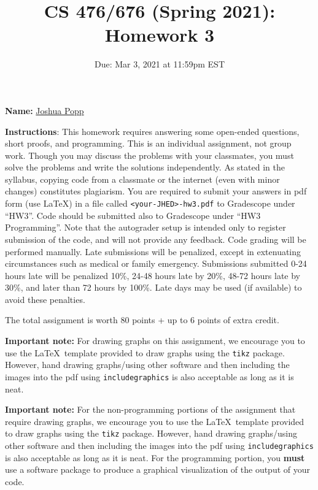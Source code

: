 \documentclass[letterpaper, 11pt]{article}
\title{CS 476/676 (Spring 2021): Homework 3}
\author{}
\date{Due: Mar 3, 2021 at 11:59pm EST}
\begin{document}
\maketitle

\setlength{\parindent}{0em}
\setlength{\parskip}{0.8em}

\large\textbf{Name:} \underline{\hspace{30pt} \color{blue} Joshua Popp \hspace{30pt}}
\vspace{1em}

	\textbf{Instructions}: This homework requires answering some open-ended questions, short proofs, and
	programming. This is an individual assignment, not group work. Though you may
	discuss the problems with your classmates, you must solve the problems and
	write the solutions independently. As stated in the syllabus, copying code
	from a classmate or the internet (even with minor changes) constitutes
	plagiarism. You are required to submit your answers in pdf form (use \LaTeX)
	in a file called \texttt{<your-JHED>-hw3.pdf} to Gradescope under ``HW3''. Code should be submitted also to Gradescope under ``HW3 Programming''. Note that the autograder setup is intended only to register submission of the code, and will not provide any feedback. Code grading will be performed manually.
	Late submissions will be penalized, except in extenuating circumstances such
	as medical or family emergency. Submissions submitted 0-24 hours late will be
	penalized 10\%, 24-48 hours late by 20\%, 48-72 hours late by 30\%, and later
    than 72 hours by 100\%. Late days may be used (if available) to avoid these penalties.

    The total assignment is worth 80 points + up to 6 points of extra credit.

    \textbf{Important note:} For drawing graphs on this assignment, we  encourage you to use the \LaTeX\  template provided to draw graphs using the \texttt{tikz} package. However, hand drawing graphs/using other software and then including the images into the pdf using \texttt{includegraphics} is also acceptable as long as it is neat.

    \textbf{Important note:} For the non-programming portions of the assignment that require drawing graphs, we  encourage you to use the \LaTeX\  template provided to draw graphs using the \texttt{tikz} package. However, hand drawing graphs/using other software and then including the images into the pdf using \texttt{includegraphics} is also acceptable as long as it is neat. For the programming portion, you \textbf{must} use a software package to produce a graphical visualization of the output of your code.
\end{document}

